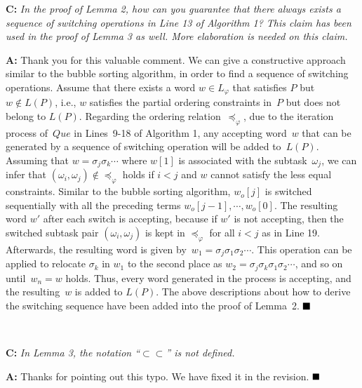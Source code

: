 \documentclass[10pt]{article}
\begin{document}

\textbf{C:}
\emph{In the proof of Lemma 2, how can you guarantee that there always
	exists a sequence of switching operations in Line 13 of Algorithm 1?
	This claim has been used in the proof of Lemma 3 as well. More
	elaboration is needed on this claim.
}

\textbf{A:} Thank you for this valuable comment.
We can give a constructive approach similar to the bubble sorting algorithm,
in order to find a sequence of switching operations.
Assume that there exists a word $w\in L_{\varphi}$ that satisfies $P$ but $w\not\in L(P)$, i.e., $w$ satisfies the partial ordering constraints in~$P$ but does not belong to $L(P)$. Regarding the ordering relation~$\preceq_{\varphi}$,
due to the iteration process of~$Que$ in Lines~9-18 of Algorithm 1,
any accepting word~$w$ that can be generated by a sequence of switching operation will be added
to~$L(P)$. Assuming that $w=\sigma_j\sigma_k\cdots$
where $w[1]$ is associated with the subtask~$\omega_j$,
we can infer that $(\omega_i,\omega_j)\notin \preceq_\varphi$ holds if $i<j$
and $w$ cannot satisfy the less equal constraints.
Similar to the bubble sorting algorithm,
$w_o[j]$ is switched sequentially with all the preceding terms $w_o[j-1],\cdots,w_o[0]$.
The resulting word $w'$ after each switch is accepting, because
if $w'$ is not accepting, then the switched subtask pair
$(\omega_i,\omega_j)$ is kept in $\preceq_\varphi$ for all $i<j$ as in Line 19.
Afterwards, the resulting word is given by~$w_1=\sigma_j\sigma_1\sigma_2\cdots$.
This operation can be applied to relocate $\sigma_k$ in $w_1$ to the second
place as $w_2=\sigma_j\sigma_k\sigma_1\sigma_2\cdots$, and so on until~$w_n=w$ holds.
Thus, every word generated in the process is accepting,
and the resulting~$w$ is added to $L(P)$.
The above descriptions about how to derive the switching sequence
have been added into the proof of Lemma~2.
$\hfill\blacksquare$


\hspace*{\fill} \


\textbf{C:}
\emph{In Lemma 3, the notation ``$\subset\subset$'' is not defined.
}

\textbf{A:} Thanks for pointing out this typo.
We have fixed it in the revision.
$\hfill\blacksquare$

\hspace*{\fill} \
\end{document}
